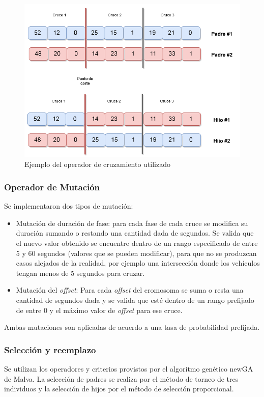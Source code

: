 \begin{figure}[H]
	\centering
	\includegraphics[width=0.8\linewidth]{Figures/alg_cruzamiento}
	\caption{Ejemplo del operador de cruzamiento utilizado}
	\label{fig:op_cruzamiento}
\end{figure}



\subsubsection{Operador de Mutación}
Se implementaron dos tipos de mutación:
\begin{itemize}
	
	\item Mutación de duración de fase: para cada fase de cada cruce se modifica su duración sumando o restando una cantidad dada de segundos. Se valida que el nuevo valor obtenido se encuentre dentro de un rango especificado de entre 5 y 60 segundos (valores que se pueden modificar), para que no se produzcan casos alejados de la realidad, por ejemplo una intersección donde los vehículos tengan menos de 5 segundos para cruzar.
	
	\item Mutación del \emph{offset}: Para cada \emph{offset} del cromosoma se suma o resta una cantidad de segundos dada y se valida que esté dentro de un rango prefijado de entre 0 y el máximo valor de \emph{offset} para ese cruce.
	

\end{itemize}
Ambas mutaciones son aplicadas de acuerdo a una tasa de probabilidad prefijada.

\subsubsection{Selección y reemplazo}
Se  utilizan los operadores y criterios provistos por el algoritmo genético newGA de Malva. La selección de padres se realiza por el método de torneo de tres individuos y la selección de hijos por el método de selección proporcional. 

